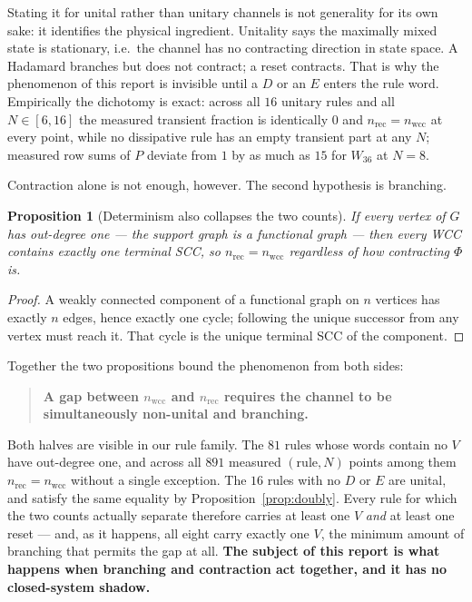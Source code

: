 \documentclass[11pt]{article}
\theoremstyle{plain}
\newtheorem{proposition}{Proposition}
\theoremstyle{definition}
\theoremstyle{remark}
\begin{document}
Stating it for unital rather than unitary channels is not generality for its
own sake: it identifies the physical ingredient. Unitality says the maximally
mixed state is stationary, i.e.\ the channel has no contracting direction in
state space. A Hadamard branches but does not contract; a reset contracts. That
is why the phenomenon of this report is invisible until a $D$ or an $E$ enters
the rule word. Empirically the dichotomy is exact: across all $16$ unitary
rules and all $N \in [6,16]$ the measured transient fraction is identically
$0$ and $n_{\mathrm{rec}} = n_{\mathrm{wcc}}$ at every point, while no
dissipative rule has an empty transient part at any $N$; measured row sums of
$P$ deviate from $1$ by as much as $15$ for $W_{36}$ at $N=8$.

Contraction alone is not enough, however. The second hypothesis is branching.

\begin{proposition}[Determinism also collapses the two counts]
\label{prop:functional}
If every vertex of $G$ has out-degree one --- the support graph is a
\emph{functional} graph --- then every WCC contains exactly one terminal SCC,
so $n_{\mathrm{rec}} = n_{\mathrm{wcc}}$ regardless of how contracting $\Phi$
is.
\end{proposition}

\begin{proof}
A weakly connected component of a functional graph on $n$ vertices has exactly
$n$ edges, hence exactly one cycle; following the unique successor from any
vertex must reach it. That cycle is the unique terminal SCC of the component.
\end{proof}

Together the two propositions bound the phenomenon from both sides:

\begin{quote}
\textbf{A gap between $n_{\mathrm{wcc}}$ and $n_{\mathrm{rec}}$ requires the
channel to be simultaneously non-unital and branching.}
\end{quote}

Both halves are visible in our rule family. The $81$ rules whose words contain
no $V$ have out-degree one, and across all $891$ measured $(\text{rule},N)$
points among them $n_{\mathrm{rec}} = n_{\mathrm{wcc}}$ without a single
exception. The $16$ rules with no $D$ or $E$ are unital, and satisfy the same
equality by Proposition~\ref{prop:doubly}. Every rule for which the two counts
actually separate therefore carries at least one $V$ \emph{and} at least one
reset --- and, as it happens, all eight carry exactly one $V$, the minimum
amount of branching that permits the gap at all. \textbf{The subject of this
report is what happens when branching and contraction act together, and it has
no closed-system shadow.}
\end{document}
